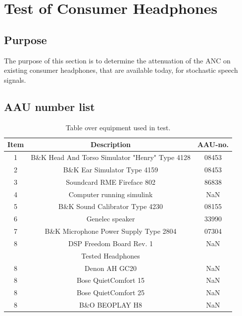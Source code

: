
\section{Test of Consumer Headphones}
\subsection{Purpose}
The purpose of this section is to determine the attenuation of the ANC on existing consumer headphones, that are available today, for stochastic speech signals.




\subsection{AAU number list}
\begin{table}[H]
	\centering
	\begin{tabular}{ c c c } \toprule
	{Item}	&	{Description} 								& {AAU-no}. \\ 
								\bottomrule 
		1	&	B\&K Head And Torso Simulator "Henry" Type 4128	& 08453	\\
		2	&	B\&K Ear Simulator Type 4159				& 08453		\\
		3	&	Soundcard RME Fireface 802					& 86838		\\
		4	&	Computer running simulink					& NaN		\\
		5	&	B\&K Sound Calibrator Type 4230				& 08155		\\ 
		6	&	Genelec speaker								& 33990		\\ 
		7	& 	B\&K Microphone Power Supply Type 2804		& 07304		\\
		8	&	DSP Freedom Board Rev. 1 					& NaN		\\
								\bottomrule
							& Tested Headphones 			& 			\\
								\bottomrule
		8	& Denon AH GC20 								& NaN 		\\
		8	& Bose QuietComfort 15 							& NaN 		\\
		8	& Bose QuietComfort 25						 	& NaN		\\
		8	& B\&O BEOPLAY H8 								& NaN		\\
								\bottomrule
	\end{tabular}
	\caption{Table over equipment used in test.}
	\label{tab:UsedEquipmentListConsumerHP}
\end{table}



